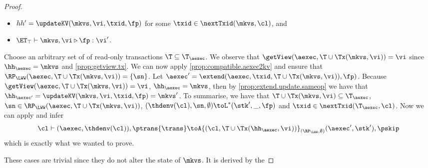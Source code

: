\begin{proof}
\begin{itemize}
\item $hh' = \updateKV(\mkvs, \vi, \txid, \fp)$ for some $\txid \in \nextTxid(\mkvs, \cl)$, and
\item $\ET_{\top} \vdash \mkvs, \vi \triangleright \fp: \vi'$.
\end{itemize}
Choose an arbitrary set of of read-only transactions $\T \subseteq \T_{\aexec}$.
We observe that $\getView(\aexec, \T \cup \Tx(\mkvs, \vi)) = \vi$ since $\hh_{\aexec} = \mkvs$ and \cref{prop:getview.tx}.
We can now apply \cref{prop:compatible.aexec2kv} and ensure that $\RP_{\LWW}(\aexec, \T \cup \Tx(\mkvs, \vi)) = \{\sn\}$.
Let $\aexec' = \extend(\aexec, \txid, \T \cup \Tx(\mkvs, \vi)), \fp)$. 
Because $\getView(\aexec, \T \cup \Tx(\mkvs, \vi)) = \vi$, $\hh_{\aexec} = \mkvs$,
then by \cref{prop:extend.update.sameop} we have that $\hh_{\aexec'} = \updateKV(\mkvs, \vi, \txid, \fp) = \mkvs'$. 
To summarise, we have that $\T \cup \Tx(\mkvs, \vi) \subseteq \T_{\aexec}$, $\sn \in \RP_{\LWW}(\aexec, \T \cup \Tx(\mkvs, \vi))$,
$(\thdenv(\cl), \sn, \emptyset) \toL^{\ast} (\stk', \_, \fp)$ and $\txid \in \nextTxid(\T_{\aexec}, \cl)$. 
Now we can apply  and infer
\[
\cl \vdash (\aexec, \thdenv(\cl)), \ptrans{\trans} \toA{(\cl, \T \cup \Tx(\hh_{\aexec}, \vi))}_{(\RP_{\LWW}, \emptyset)} 
(\aexec', \stk'), \pskip
\]
which is exactly what we wanted to prove. 

These cases are trivial since they do not alter the state of \( \mkvs \).
It is derived by the \ih
\end{proof}

